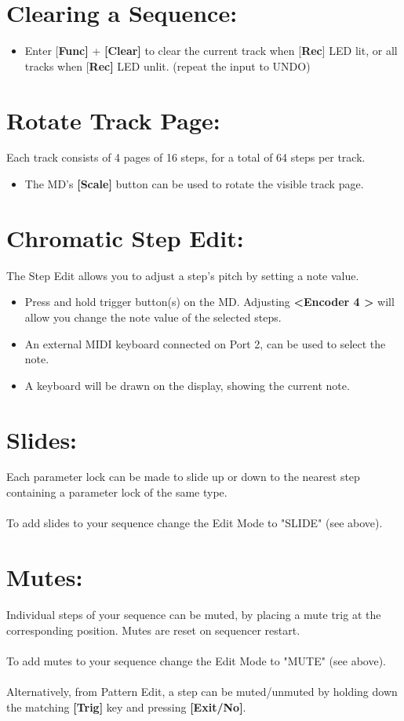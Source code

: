 \section{Clearing a Sequence:}
\begin{itemize}
\item Enter [\textbf{Func]} + \textbf{[Clear]} to clear the current track when [\textbf{Rec}] LED lit, or all tracks when [\textbf{Rec]} LED unlit. (repeat the input to UNDO)
\end{itemize}
\section{Rotate Track Page:}
Each track consists of 4 pages of 16 steps, for a total of 64 steps per track.
\begin{itemize}
\item The MD's \textbf{[Scale]} button can be used to rotate the visible track page.
\end{itemize}
\section{Chromatic Step Edit:}
The Step Edit allows you to adjust a step's pitch by setting a note value. 
\begin{itemize}
\item Press and hold trigger button(s) on the MD. Adjusting \textbf{<Encoder 4 >} will allow you change the note value of the selected steps.
\item An external MIDI keyboard connected on Port 2, can be used to select the note.
\item A keyboard will be drawn on the display, showing the current note.
\end{itemize}
\section{Slides:}
Each parameter lock can be made to slide up or down to the nearest step containing a parameter lock of the same type.
\\\\
To add slides to your sequence change the Edit Mode to "SLIDE" (see above).
\section{Mutes:}
Individual steps of your sequence can be muted, by placing a mute trig at the corresponding position. Mutes are reset on sequencer restart.\\\\ 
To add mutes to your sequence change the Edit Mode to "MUTE" (see above).\\\\
Alternatively, from Pattern Edit, a step can be muted/unmuted by holding down the matching \textbf{[Trig]} key and pressing \textbf{[Exit/No]}.

